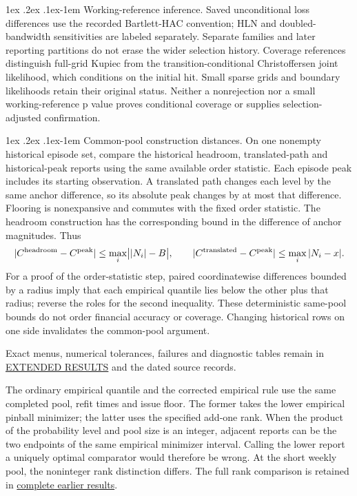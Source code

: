 \documentclass[12pt,a4paper]{article}
\makeatletter
\renewcommand\paragraph{\@startsection{paragraph}{4}{\z@}%
  {1ex \@plus .2ex \@minus .1ex}{-1em}%
  {\normalfont\normalsize\bfseries}}
\makeatother
\begin{document}
\paragraph{Working-reference inference.}
Saved unconditional loss differences use the recorded Bartlett-HAC convention;
HLN and doubled-bandwidth sensitivities are labeled separately. Separate
families and later reporting partitions do not erase the wider selection
history. Coverage references distinguish full-grid Kupiec from the
transition-conditional Christoffersen joint likelihood, which conditions on
the initial hit. Small sparse grids and boundary likelihoods retain their
original status. Neither a nonrejection nor a small working-reference p value
proves conditional coverage or supplies selection-adjusted confirmation.

\paragraph{Common-pool construction distances.}
On one nonempty historical episode set, compare the historical headroom,
translated-path and historical-peak reports using the same available order
statistic. Each episode peak includes its starting observation. A translated
path changes each level by the same anchor difference, so its absolute peak
changes by at most that difference. Flooring is nonexpansive and commutes with
the fixed order statistic. The headroom construction has the corresponding
bound in the difference of anchor magnitudes. Thus
\[
|C^{\rm headroom}-C^{\rm peak}|\le\max_i\bigl||N_i|-B\bigr|,\qquad
|C^{\rm translated}-C^{\rm peak}|\le\max_i|N_i-x|.
\]
For a proof of the order-statistic step, paired coordinatewise differences
bounded by a radius imply that each empirical quantile lies below the other
plus that radius; reverse the roles for the second inequality. These
deterministic same-pool bounds do not order financial accuracy or coverage.
Changing historical rows on one side invalidates the common-pool argument.

Exact menus, numerical tolerances, failures and diagnostic tables remain in
\href{https://github.com/ByronLi0207/financial-mathematics-paper-20261020/blob/revision-v7-final/EXTENDED_RESULTS.md}{EXTENDED RESULTS} and the dated source records.

The ordinary empirical quantile and the corrected empirical rule use
the same completed pool, refit times and issue floor. The former takes the
lower empirical pinball minimizer; the latter uses the specified add-one rank.
When the product of the probability level and pool size is an integer, adjacent reports can be the two endpoints of the same empirical minimizer interval. Calling the lower report a
uniquely optimal comparator would therefore be wrong. At the short weekly pool,
the noninteger rank distinction differs.
The full rank comparison is retained in \href{https://github.com/ByronLi0207/financial-mathematics-paper-20261020/blob/submission-final/EXTENDED_RESULTS.md#asmbi-extended-s08}{complete earlier results}.
\end{document}
